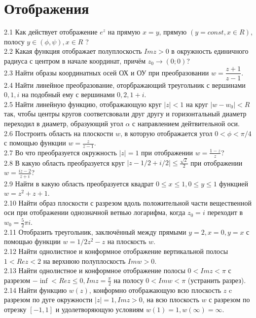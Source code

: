 \documentclass{article}
\begin{document}
\section{Отображения}
2.1 Как действует отображение $e^z$ на прямую $x=y$, прямую $(y=const, x\in R)$, полосу $y\in(\phi, \psi), x\in R$ ?\\
2.2 Какая функция отображает полуплоскость $Im z > 0$ в окружность единичного радиуса с центром в начале координат, причём $z_0 \rightarrow (0; 0)$? \\
2.3 Найти образы координатных осей ОХ и ОУ при преобразовании $w= \dfrac{z+1}{z-1}$.\\
2.4 Найти линейное преобразование, оторбражающий треугольник с вершинами $0, 1, i$  на подобный ему с вершинами $0, 2, 1+i$.\\
2.5 Найти линейную функцию, отображающую круг $\vert z \vert < 1$  на круг $\vert w - w_0 \vert < R$ так, чтобы центры кругов соответсвовали друг другу и горизонтальный диаметр переходил в диаметр, образующий угол $\alpha$ с направлением дейтвительной оси.\\
2.6 Построить область на плоскости $w$, в которую отображается угол $0<\phi<\pi/4$ с помощью функции $w=\frac{z}{z-1}$.\\
2.7 Во что преобразуется окружность $\vert z \vert =1 $ при отображении $w=\frac{1-z}{z}$?\\
2.8 В какую область преобразуется круг $\vert z - 1/2 +i/2\vert\leq\frac{\sqrt{2}}{2}$ при отображении $w=\frac{iz-2}{z+i}$?\\
2.9 Найти в какую область преобразуется квадрат $0\leq x \leq1, 0\leq y \leq1$ функцией $w=z^2+z+1$.\\
2.10 Найти образ плоскости с разрезом вдоль положительной части вещественной оси при отображении однозначной ветвью логарифма, когда $z_0=i$ переходит в $w_0=\frac{5}{2}\pi i$.\\
2.11 Отобразить треугольник, заключённый между прямыми $y=2, x=0, y=x$ с помощью функции $w=1/2z^2-z$ на плоскость $w$.\\
2.12 Найти однолистное и конформное отображение вертикальной полосы $1 < Re z < 2$  на верхнюю полуплоскость $Im w > 0$.\\
2.13 Найти однолистное и конформное отображение полосы $0 < Im z < \pi$ с разрезом $-\inf < Re z \leq 0, {Im} z =\frac{\pi}{2}$ на полосу $0 < {Im} w < \pi$ (устранить разрез).\\
2.14 Найти функцию $w(z)$, конформно отображающую всю плоскость $z$ c разрезом по дуге окружности $\vert z \vert = 1, Im {z}>0$, на всю плоскость $w$ с разрезом по отрезку $[-1, 1]$ и удолетворяющую условиям $w(1)=1, w(\infty)=\infty$.\\
\end{document}

